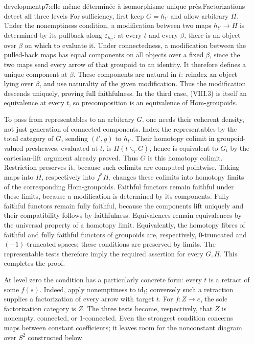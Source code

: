 \begin{dcomment}{development}{p7:elle même déterminée à isomorphisme unique près.}{Factorizations detect all three levels}
For sufficiency, first keep $G=h_{t'}$ and allow arbitrary $H$. Under the nonemptiness condition, a modification between two maps $h_{t'}\to H$ is determined by its pullback along $\varepsilon_{h_{t'}}$: at every $t$ and every $\beta$, there is an object over $\beta$ on which to evaluate it. Under connectedness, a modification between the pulled-back maps has equal components on all objects over a fixed $\beta$, since the two maps send every arrow of that groupoid to an identity. It therefore defines a unique component at $\beta$. These components are natural in $t$: reindex an object lying over $\beta$, and use naturality of the given modification. Thus the modification descends uniquely, proving full faithfulness. In the third case, (VIII.3) is itself an equivalence at every $t$, so precomposition is an equivalence of Hom-groupoids.

To pass from representables to an arbitrary $G$, one needs their coherent density, not just generation of connected components. Index the representables by the total category of $G$, sending $(t',g)$ to $h_{t'}$. Their homotopy colimit in groupoid-valued presheaves, evaluated at $t$, is $\Pi(t\backslash_T G)$, hence is equivalent to $G_t$ by the cartesian-lift argument already proved. Thus $G$ is this homotopy colimit. Restriction preserves it, because such colimits are computed pointwise. Taking maps into $H$, respectively into $f^*H$, changes these colimits into homotopy limits of the corresponding Hom-groupoids. Faithful functors remain faithful under these limits, because a modification is determined by its components. Fully faithful functors remain fully faithful, because the components lift uniquely and their compatibility follows by faithfulness. Equivalences remain equivalences by the universal property of a homotopy limit. Equivalently, the homotopy fibres of faithful and fully faithful functors of groupoids are, respectively, $0$-truncated and $(-1)$-truncated spaces; these conditions are preserved by limits. The representable tests therefore imply the required assertion for every $G,H$. This completes the proof.

At level zero the condition has a particularly concrete form: every $t$ is a retract of some $f(s)$. Indeed, apply nonemptiness to $\mathrm{id}_t$; conversely such a retraction supplies a factorization of every arrow with target $t$. For $f:Z\to e$, the sole factorization category is $Z$. The three tests become, respectively, that $Z$ is nonempty, connected, or $1$-connected. Even the strongest condition concerns maps between constant coefficients; it leaves room for the nonconstant diagram over $S^2$ constructed below.
\end{dcomment}


